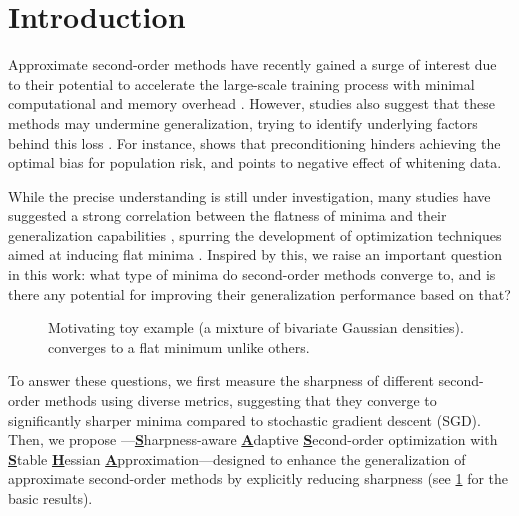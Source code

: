 \section{Introduction}\label{sec:intro}

Approximate second-order methods have recently gained a surge of interest due to their potential to accelerate the large-scale training process with minimal computational and memory overhead \citep{adahessian, sophia, gupta2018shampoo}.
However, studies also suggest that these methods may undermine generalization, trying to identify underlying factors behind this loss \citep{wilson2017marginal, zhou2020towards, zou2022understanding}.
For instance, \citet{amari2021when} shows that preconditioning hinders achieving the optimal bias for population risk, and \citet{wadia2021whitening} points to negative effect of whitening data.

While the precise understanding is still under investigation, many studies have suggested a strong correlation between the flatness of minima and their generalization capabilities \citep{keskar2016large}, spurring the development of optimization techniques aimed at inducing flat minima \citep{chaudhari2017entropy, izmailov2018averaging, sam, antipgd_orvieto22a}.
Inspired by this, we raise an important question in this work:
what type of minima do second-order methods converge to, and is there any potential for improving their generalization performance based on that?

\begin{figure}
    \centering
    \caption{
        Motivating toy example (a mixture of bivariate Gaussian densities).
        \sassha converges to a flat minimum unlike others.
    }
    \label{fig:motivate}
    
\end{figure}

To answer these questions, we first measure the sharpness of different second-order methods using diverse metrics, suggesting that they converge to significantly sharper minima compared to stochastic gradient descent (SGD).
Then, we propose \sassha---\underline{\textbf{S}}harpness-aware \underline{\textbf{A}}daptive \underline{\textbf{S}}econd-order optimization with \underline{\textbf{S}}table \underline{\textbf{H}}essian \underline{\textbf{A}}pproximation---designed to enhance the generalization of approximate second-order methods by explicitly reducing sharpness (see \cref{fig:motivate} for the basic results).

